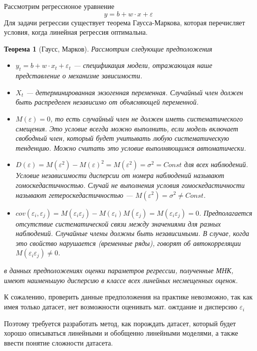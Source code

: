 \documentclass[a4paper,14pt]{extarticle}
\newtheorem{theorem}{Теорема}
\numberwithin{equation}{section}
\begin{document}
Рассмотрим регрессионое уравнение 
\begin{equation}
y = b+w\cdot x+\varepsilon
\end{equation}
Для задачи регрессии существует теорема Гаусса-Маркова, которая перечисляет условия, когда линейная регрессия оптимальна. 
\begin{theorem}[Гаусс, Марков] Рассмотрим следующие предположения
\begin{itemize}
	\item $y_t = b+w\cdot x_t+\varepsilon_t$ --- спецификация модели, отражающая наше представление о механизме зависимости.
	\item $X_t$ --- детерминированная экзогенная переменная. Случайный член должен быть распределен независимо от объясняющей переменной.
	\item $M(\varepsilon) = 0$, то есть случайный член не должен иметь систематического смещения. Это условие всегда можно выполнить, если модель включает свободный член, который будет учитывать любую систематическую  тенденцию. Можно считать это условие выполняющимся автоматически.
	\item   $D(\varepsilon) = M(\varepsilon^2) - M(\varepsilon)^2 = M(\varepsilon^2) = \sigma^2 = Const$ для всех наблюдений. Условие независимости дисперсии от номера наблюдений называют гомоскедастичностью. Случай не выполнения условия гомоскедастичности называют гетероскедастичностью --- $M(\varepsilon^2) = \sigma^2 \neq Const$.
	\item $cov(\varepsilon_i, \varepsilon_j) = M(\varepsilon_i \varepsilon_j) - M(\varepsilon_i)M(\varepsilon_j) = M(\varepsilon_i \varepsilon_j) = 0$. Предполагается отсутствие систематической связи между значениями  для разных наблюдений. Случайные члены должны быть независимыми. В случае, когда это свойство нарушается (временные ряды), говорят об автокорреляции $M(\varepsilon_i \varepsilon_j) \neq 0$.
\end{itemize}
в данных предположениях оценки параметров регрессии, полученные МНК, имеют наименьшую дисперсию в классе всех линейных несмещенных оценок.
\end{theorem}

К сожалению, проверить данные предположения на практике невозможно, так как имея только датасет, нет возможности оценивать мат. ожтдание и дисперсию $\varepsilon_i$

Поэтому требуется разработать метод, как порождать датасет, который будет хорошо описываться линейными и обобщенно линейными моделями, а также ввести понятие сложности датасета.
\end{document}
